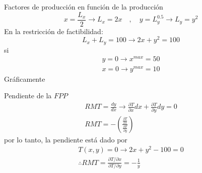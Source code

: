 Factores de producción en función de la producción
	$$x = \frac{L_x}{2} \rightarrow L_x = 2x \quad , \quad y = L_{y}^{0.5} \rightarrow L_y = y^2$$
En la restricción de factibilidad:
	$$L_x + L_y = 100 \rightarrow 2x + y^2 = 100$$
si
	\begin{gather*}
		y = 0 \rightarrow x^{max} = 50\\
		x = 0 \rightarrow y^{max} = 10
	\end{gather*}
Gráficamente
	\begin{center}
	\end{center}
Pendiente de la $FPP$
	\begin{gather*}
		RMT = \frac{dy}{dx} \rightarrow \frac{\partial T}{\partial x}dx + \frac{\partial T}{\partial y}dy=0\\[0.2cm]
		RMT = -\left( \frac{\frac{\partial T}{\partial x}}{\frac{\partial T}{\partial y}}\right) 
	\end{gather*}
por lo tanto, la pendiente está dado por
	\begin{gather*}
		T(x,y)=0 \rightarrow 2x+y^2-100=0\\[0.2cm]
		\therefore	RMT = \frac{\partial T/\partial x}{\partial T/\partial y} = -\frac{1}{y}
	\end{gather*}
	